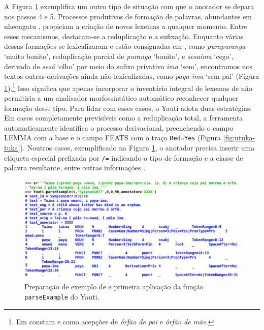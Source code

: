 \documentclass[portuguese]{textolivre}
\newcommand{\wt}[2]{\textit{#1} `#2'}
\newcommand{\pvtres}{\parencite{alencar2023-yauti}}
\begin{document}
A Figura \ref{fig:sufixo-privativo-idle} exemplifica um outro tipo de situação com que o anotador se depara nos passos 4 e 5. Processos produtivos de formação de palavras, abundantes em nheengatu \parencite{sympson1877,stradelli1929,cruz2011,navarro2016,avila2021}, propiciam a criação de novos lexemas a qualquer momento. Entre esses mecanismos, destacam-se a reduplicação e a sufixação. Enquanto várias dessas formações se lexicalizaram e estão consignadas em \textcite{avila2021}, como \wt{purapuranga}{muito bonito}, reduplicação parcial de \wt{puranga}{bonito}, e \wt{sesaíma}{cego}, derivada de \wt{sesá}{olho} por meio do sufixo privativo \wt{ima}{sem}, encontramos nos textos outras derivações ainda não lexicalizadas, como \wt{paya-ima}{sem pai} (Figura \ref{fig:sufixo-privativo-idle}).\footnote{Em \textcite[p. 276]{stradelli1929} constam  e  como acepções de \textit{órfão de pai} e \textit{órfão de mãe}.} Isso significa que apenas incorporar o inventário integral de lexemas de \textcite{avila2021} não permitiria a um analisador morfossintático automático reconhecer qualquer formação desse tipo. Para lidar com esses casos, o Yauti adota duas estratégias. Em casos completamente previsíveis como a reduplicação total, a ferramenta automaticamente identifica o processo derivacional, preenchendo o campo LEMMA com a base e o campo FEATS com o traço \texttt{Red=Yes} (Figura \ref{fig:utuka-tuka}). Noutros casos, exemplificado na Figura \ref{fig:sufixo-privativo-idle}, o anotador precisa inserir uma etiqueta especial prefixada por \texttt{/=} indicando o tipo de formação e a classe de palavra resultante, entre outras informações \pvtres. 

\begin{figure}[htbp]
  \centering
  \begin{minipage}{.75\textwidth}
    \includegraphics[width=\linewidth]{figures/sufixo-privativo-idle.pdf}
    \caption{Preparação de exemplo de \textcite[p. 8]{sympson1877} e primeira aplicação da função \texttt{parseExample} do Yauti.}
    \label{fig:sufixo-privativo-idle}
  \end{minipage}
\end{figure}
\end{document}
